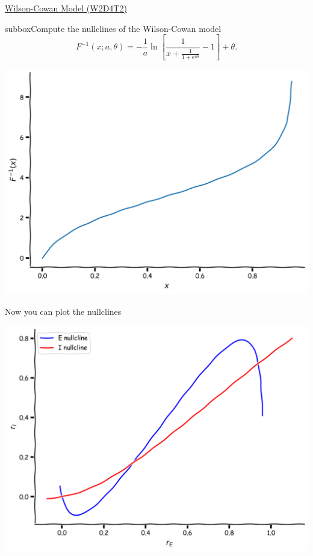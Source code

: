 \begin{textbox}{\href{https://compneuro.neuromatch.io/tutorials/W2D4_DynamicNetworks/chapter_title.html}{Wilson-Cowan Model (W2D4T2)} }
\begin{subbox}{subbox}{Compute the nullclines of the Wilson-Cowan model}
$$
F^{-1}(x; a, \theta) = -\frac{1}{a} \ln \left[ \frac{1}{x + \displaystyle \frac{1}{1+\text{e}^{a\theta}}} - 1 \right] + \theta.
$$
\begin{center}
\includegraphics[scale=0.15]{Figures/DN/DN_Figure8.png}
\end{center}
Now you can plot the nullclines
\begin{center}
\includegraphics[scale=0.15]{Figures/DN/DN_Figure9.png}
\end{center}

\end{subbox}
\end{textbox}
